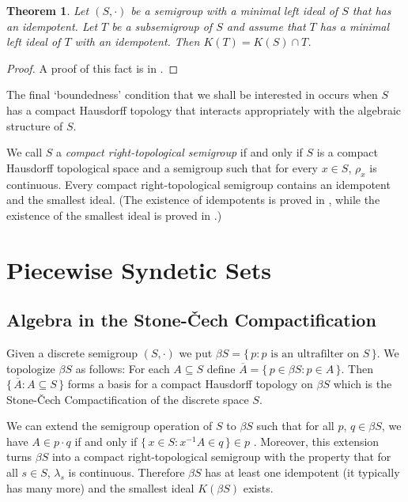 \documentclass[12pt]{article}
\theoremstyle{plain}
\newtheorem{thm}{Theorem}[section]
\theoremstyle{definition}
\begin{document}
\begin{thm}
  Let $(S, \cdot)$ be a semigroup with a minimal left ideal of $S$ that has an idempotent. 
  Let $T$ be a subsemigroup of $S$ and assume that $T$ has a minimal left ideal of $T$ with an idempotent.
  Then $K(T) = K(S) \cap T$.
\end{thm}
\begin{proof}
  A proof of this fact is in \cite[Theorem 1.65]{Hindman:1998fk}.
\end{proof}

The final `boundedness' condition that we shall be interested in occurs when $S$ has a compact Hausdorff topology that interacts appropriately with the algebraic structure of $S$.

We call $S$ a \textsl{compact right-topological semigroup} if and only if $S$ is a compact Hausdorff topological space and a semigroup such that for every $x \in S$, $\rho_x$ is continuous. 
Every compact right-topological semigroup contains an idempotent and the smallest ideal.
(The existence of idempotents is proved in \cite[Theorem 2.5]{Hindman:1998fk}, while the existence of the smallest ideal is proved in \cite[Theorem 2.8]{Hindman:1998fk}.)



\section{Piecewise Syndetic Sets}

\subsection{Algebra in the Stone-\v{C}ech Compactification}
Given a discrete semigroup $(S, \cdot)$ we put $\beta S = \{\, p : \mbox{$p$ is an ultrafilter on $S$} \,\}$.
We topologize $\beta S$ as follows: For each $A \subseteq S$ define $\overline{A} = \{\, p \in \beta S : p \in A \,\}$.
Then $\{\, \overline{A} : A \subseteq S \,\}$ forms a basis for a compact Hausdorff topology on $\beta S$ which is the Stone-\v{C}ech Compactification \cite[Theorem 3.27]{Hindman:1998fk} of the discrete space $S$.

We can extend the semigroup operation of $S$ to $\beta S$ \cite[Theorem 4.1]{Hindman:1998fk} such that for all $p$, $q \in \beta S$, we have $A \in p \cdot q$ if and only if $\{\, x \in S : x^{-1}A \in q \,\} \in p$ \cite[Theorem 4.12(b)]{Hindman:1998fk}.
Moreover, this extension turns $\beta S$ into a compact right-topological semigroup with the property that for all $s \in S$, $\lambda_s$ is continuous. 
Therefore $\beta S$ has at least one idempotent (it typically has many more) and the smallest ideal $K(\beta S)$ exists. 
\end{document}
